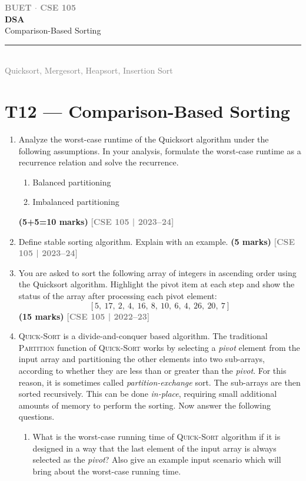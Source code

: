 \documentclass[12pt,a3paper]{article}
\newcommand{\yr}[1]{\hfill\textcolor{gray}{\small\textbf{[#1]}}}
\newcommand{\mk}[1]{\textcolor{orange!70!black}{\small\textbf{(#1 marks)}}}
\newcommand{\secdivider}[4]{%
  \newpage\thispagestyle{empty}%
  \vspace*{\fill}%
  \begin{tcolorbox}[enhanced,colback=#4!7,colframe=#3,boxrule=1.5pt,arc=8pt,
    left=20pt,right=20pt,top=22pt,bottom=22pt,
    shadow={3pt}{-3pt}{0pt}{black!15}]
    \centering
    {\large\textcolor{gray}{\textbf{BUET $\cdot$ CSE 105}}}\\[8pt]
    {\fontsize{26}{32}\selectfont\bfseries\textcolor{#3}{DSA}}\\[6pt]
    {\fontsize{15}{19}\selectfont\textcolor{dgray}{#1}}\\[12pt]
    \textcolor{#3!60}{\rule{0.5\textwidth}{0.5pt}}\\[6pt]
    {\small\textcolor{gray}{#2}}
  \end{tcolorbox}%
  \vspace*{\fill}\newpage%
}
\begin{document}
\secdivider{Comparison-Based Sorting}{Quicksort, Mergesort, Heapsort, Insertion Sort}{cE}{cE}
\label{sec:T12}
\section{T12 --- Comparison-Based Sorting}

\begin{enumerate}
\item Analyze the worst-case runtime of the Quicksort algorithm under the following assumptions. In your analysis, formulate the worst-case runtime as a recurrence relation and solve the recurrence.
\begin{enumerate}
  \item Balanced partitioning
  \item Imbalanced partitioning
\end{enumerate}
\mk{5+5=10}
\yr{CSE 105 | 2023--24}

\item Define stable sorting algorithm. Explain with an example. \mk{5}
\yr{CSE 105 | 2023--24}

\item You are asked to sort the following array of integers in ascending order using the Quicksort algorithm. Highlight the pivot item at each step and show the status of the array after processing each pivot element:
\[ [5,\ 17,\ 2,\ 4,\ 16,\ 8,\ 10,\ 6,\ 4,\ 26,\ 20,\ 7] \]
\mk{15}
\yr{CSE 105 | 2022--23}

\item \textsc{Quick-Sort} is a divide-and-conquer based algorithm. The
traditional \textsc{Partition} function of \textsc{Quick-Sort} works by
selecting a \textit{pivot} element from the input array and partitioning the
other elements into two sub-arrays, according to whether they are less than or
greater than the \textit{pivot}. For this reason, it is sometimes called
\textit{partition-exchange} sort. The sub-arrays are then sorted recursively.
This can be done \textit{in-place}, requiring small additional amounts of memory
to perform the sorting. Now answer the following questions.
\begin{enumerate}[label=(\roman*)]
  \item What is the worst-case running time of \textsc{Quick-Sort} algorithm if
  it is designed in a way that the last element of the input array is always
  selected as the \textit{pivot}? Also give an example input scenario which will
  bring about the worst-case running time.


\end{enumerate}
\end{enumerate}
\end{document}
